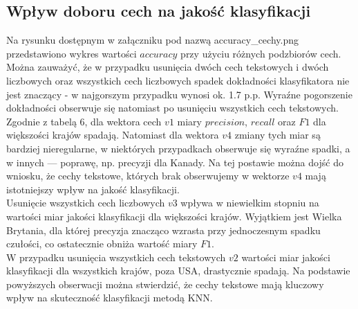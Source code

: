 \documentclass{article}
\begin{document}
\subsection{Wpływ doboru cech na jakość klasyfikacji}
Na rysunku dostępnym w załączniku pod nazwą accuracy\_cechy.png przedstawiono wykres wartości \(accuracy\) przy użyciu różnych podzbiorów cech. Można zauważyć, że w przypadku usunięcia dwóch cech tekstowych i dwóch liczbowych oraz  wszystkich cech liczbowych spadek dokładności klasyfikatora nie jest znaczący - w najgorszym przypadku wynosi ok. 1.7 p.p. Wyraźne pogorszenie dokładności obserwuje się natomiast po usunięciu wszystkich cech tekstowych. \\
Zgodnie z tabelą 6, dla wektora cech \(v1\) miary \(precision\), \(recall\) oraz \(F1\) dla większości krajów spadają. Natomiast dla wektora \(v4\) zmiany tych miar są bardziej nieregularne, w niektórych przypadkach obserwuje się wyraźne spadki, a w innych — poprawę, np. precyzji dla Kanady. Na tej postawie można dojść do wniosku, że cechy tekstowe, których brak obserwujemy w wektorze \(v4\) mają istotniejszy wpływ na jakość klasyfikacji. \\
Usunięcie wszystkich cech liczbowych \(v3\) wpływa w niewielkim stopniu na wartości miar jakości klasyfikacji dla większości krajów. Wyjątkiem jest Wielka Brytania, dla której precyzja znacząco wzrasta przy jednoczesnym spadku czułości, co ostatecznie obniża wartość miary \(F1\). \\
W przypadku usunięcia wszystkich cech tekstowych \(v2\) wartości miar jakości klasyfikacji dla wszystkich krajów, poza USA, drastycznie spadają. Na podstawie powyższych obserwacji można stwierdzić, że cechy tekstowe mają kluczowy wpływ na skuteczność klasyfikacji metodą KNN.
\end{document}
